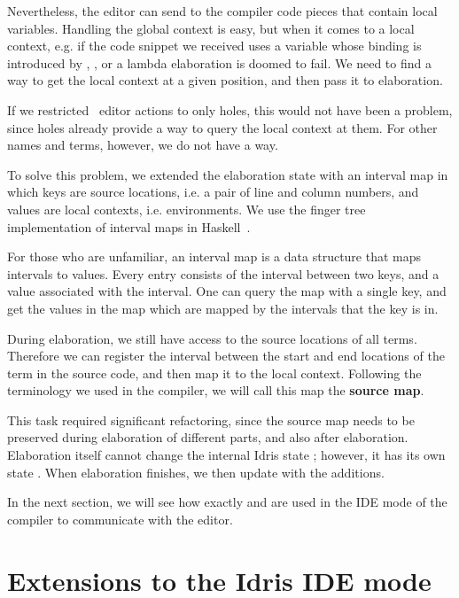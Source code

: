Nevertheless, the editor can send to the compiler code pieces that contain local variables.
Handling the global context is easy, but when it comes to a local context, e.g. if the
code snippet we received uses a variable whose binding is introduced by
, , or a lambda elaboration is doomed to fail.
We need to find a way to get the local context at a given position, and then
pass it to elaboration.

If we restricted \Elab\ editor actions to only holes, this would not have been
a problem, since holes already provide a way to query the local context at
them. For other names and terms, however, we do not have a way.

To solve this problem, we extended the elaboration state with an interval map
in which keys are source locations, i.e. a pair of line and column numbers, and
values are local contexts, i.e. environments. We use the finger tree
implementation of interval maps in Haskell~\cite{fingertrees}.

For those who are unfamiliar, an interval map is a data structure that maps
intervals to values. Every entry consists of the interval between two keys, and
a value associated with the interval. One can query the map with a single
key, and get the values in the map which are mapped by the intervals that
the key is in.

During elaboration, we still have access to the source locations of all terms.
Therefore we can register the interval between the start and end locations of
the term in the source code, and then map it to the local context.
Following the terminology we used in the compiler, we will call this map the
\textbf{source map}.

This task required significant refactoring, since the source map
needs to be preserved during elaboration of different parts, and also after
elaboration. Elaboration itself cannot change the internal Idris state
; however, it has its own state . When elaboration
finishes, we then update  with the additions.

In the next section, we will see how exactly  and 
are used in the IDE mode of the compiler to communicate with the editor.

\section{Extensions to the Idris IDE mode}\label{sec:idemode}

